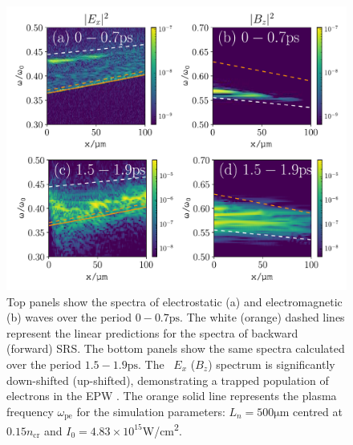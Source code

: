 \begin{figure}[h!]
    \centering
    \includegraphics[width=\columnwidth]{Chapters/C4_iSRS/fig4_4a_4b_4c_4d.pdf}
    \caption{Top panels show the spectra of electrostatic (a) and electromagnetic (b) waves over the period $0-0.7\si{\pico\second}$.
    The white (orange) dashed lines represent the linear predictions for the spectra of backward (forward) SRS. The bottom panels show the same spectra calculated over the period $1.5-1.9\si{\pico\second}$. The \
$E_x$ ($B_z$)
    spectrum is significantly down-shifted (up-shifted), demonstrating a trapped population of electrons in the EPW \cite{Yin2006}.
    The orange solid line represents the plasma frequency $\omega_{\mathrm{pe}}$ for the simulation parameters: $L_n = 500 \si{\micro\metre} $ centred at $0.15n_\mathrm{cr}$ and $I_0 = 4.83\times10^{15}$\si{W/\centi\metre^2}.}
    \label{fig:downshift}
\end{figure}{}

